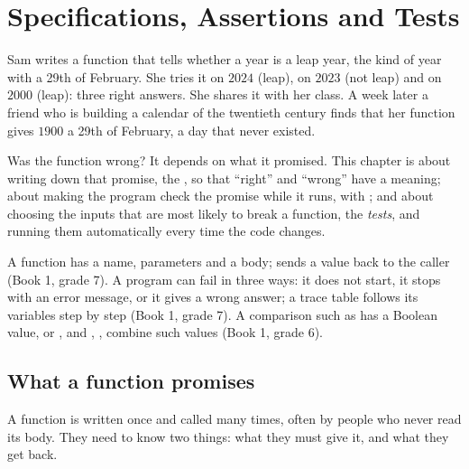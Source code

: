 \chapter{Specifications, Assertions and Tests}\label{ch:g10:specifications-and-tests}

Sam writes a function that tells whether a year is a leap year, the kind of year with a 29th of February. She
tries it on $2024$ (leap), on $2023$ (not leap) and on $2000$ (leap): three right answers. She shares it with her
class. A week later a friend who is building a calendar of the twentieth century finds that her function
gives $1900$ a 29th of February, a day that never existed.

Was the function wrong? It depends on what it promised. This chapter is about writing down that promise, the
\emph{}, so that ``right'' and ``wrong'' have a meaning; about making the program check the
promise while it runs, with \emph{}; and about choosing the inputs that are most likely to break a
function, the \emph{tests}, and running them automatically every time the code changes.

\begin{recall}
A function has a name, parameters and a body;  sends a value back to the caller (Book 1, grade 7).
A program can fail in three ways: it does not start, it stops with an error message, or it gives a wrong answer;
a trace table follows its variables step by step (Book 1, grade 7). A comparison such as  has a
Boolean value,  or , and , ,  combine such values (Book 1,
grade 6).
\end{recall}

\section{What a function promises}\label{sec:g10:specifications-and-tests:promise}

A function is written once and called many times, often by people who never read its body. They need to know two
things: what they must give it, and what they get back.

